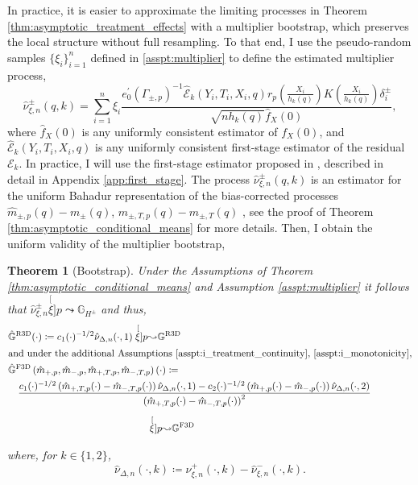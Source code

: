 \documentclass[12pt]{article}
\newtheorem{theorem}{Theorem}
\newcommand{\sumn}{\sum_{i=1}^n}
\begin{document}
In practice, it is easier to approximate the limiting processes in Theorem \ref{thm:asymptotic_treatment_effects} with a multiplier bootstrap, which preserves the local structure without full resampling. To that end, I use the pseudo-random samples $\{ \xi_i \}_{i=1}^n$ defined in \ref{asspt:multiplier} to define the estimated multiplier process,
\begin{equation} \label{eq:EMP}
\hat{\nu}^\pm_{\xi, n}(q, k) = \sumn 
\xi_i \frac{e_0^{\prime}\left(\Gamma_{\pm, p}\right)^{-1} \hat{\mathcal{E}}_k\left(Y_i, T_i, X_i, q\right) r_p\left(\frac{X_i}{h_{k}\left(q\right)}\right) K\left(\frac{X_i}{h_{k}\left(q\right)}\right) \delta_i^{ \pm}}{\sqrt{n h_{k}\left(q\right)} \hat{f}_X(0)},
\end{equation}
where $\hat{f}_X(0)$ is any uniformly consistent estimator of $f_X(0)$, and $\hat{\mathcal{E}}_k\left(Y_i, T_i, X_i, q \right)$ is any uniformly consistent first-stage estimator of the residual $\mathcal{E}_k$. In practice, I will use the first-stage estimator proposed in \citet[A.6]{chiang2019robust}, described in detail in Appendix \ref{app:first_stage}. The process $\hat{\nu}^\pm_{\xi, n}(q, k)$ is an estimator for the uniform Bahadur representation of the bias-corrected processes $\hat{m}_{\pm,p}(q) - m_{\pm}(q)$, $\hat{m}_{\pm,T,p}(q) - m_{\pm,T}(q)$  \citep{chiang2019robust}, see the proof of Theorem \ref{thm:asymptotic_conditional_means} for more details. Then, I obtain the uniform validity of the multiplier bootstrap,
\begin{theorem}[Bootstrap] \label{thm:bootstrap}
Under the Assumptions of Theorem \ref{thm:asymptotic_conditional_means} and Assumption \ref{asspt:multiplier} it follows that $\hat{\nu}_{\xi,n}^\pm \stackrel[\xi]{p}{\leadsto} \mathbb{G}_{H^\pm}$ and thus,
\begin{align*}
&  \hat{\mathbb{G}}^{\mathrm{R3D}}(\cdot) \coloneqq c_1(\cdot)^{-1/2} \hat{\nu}_{\Delta, n}(\cdot, 1) \stackrel[\xi]{p}{\leadsto} \mathbb{G}^{\mathrm{R3D}} \\ 
\intertext{and under the additional Assumptions 
  \ref{asspt:i_treatment_continuity}, \ref{asspt:i_monotonicity},}
& \hat{\mathbb{G}}^{\mathrm{F3D}}\left(\hat{m}_{+,p}, \hat{m}_{-,p}, \hat{m}_{+,T,p}, \hat{m}_{-,T,p}\right)(\cdot) \coloneqq \\ 
&  \quad \frac{ c_1(\cdot)^{-1/2}\left(\hat{m}_{+,T,p}(\cdot)-\hat{m}_{-,T,p}(\cdot)\right)\hat{\nu}_{\Delta, n}(\cdot, 1)-c_2(\cdot)^{-1/2}\left(\hat{m}_{+,p}(\cdot)-\hat{m}_{-,p}(\cdot)\right)\hat{\nu}_{\Delta, n}(\cdot, 2)
}{
\left(\hat{m}_{+, T,p}(\cdot)-\hat{m}_{-, T,p}(\cdot)\right)^2
}\\[5pt]
&\hspace{5cm} \stackrel[\xi]{p}{\leadsto} \mathbb{G}^{\mathrm{F3D}} 
\end{align*}

where, for $k \in \{1,2\}$,
\[
\hat{\nu}_{\Delta, n}(\cdot, k) \coloneqq \hat{\nu}^+_{\xi, n}(\cdot, k) - \hat{\nu}^-_{\xi, n}(\cdot, k).
\]
\end{theorem}
\end{document}
